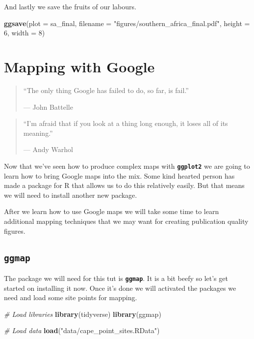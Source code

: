 \documentclass[]{book}
\newenvironment{Shaded}{\begin{snugshade}}{\end{snugshade}}
\newcommand{\KeywordTok}[1]{\textcolor[rgb]{0.13,0.29,0.53}{\textbf{#1}}}
\newcommand{\DataTypeTok}[1]{\textcolor[rgb]{0.13,0.29,0.53}{#1}}
\newcommand{\DecValTok}[1]{\textcolor[rgb]{0.00,0.00,0.81}{#1}}
\newcommand{\StringTok}[1]{\textcolor[rgb]{0.31,0.60,0.02}{#1}}
\newcommand{\CommentTok}[1]{\textcolor[rgb]{0.56,0.35,0.01}{\textit{#1}}}
\newcommand{\NormalTok}[1]{#1}
\theoremstyle{definition}
\theoremstyle{definition}
\theoremstyle{definition}
\theoremstyle{remark}
\begin{document}
And lastly we save the fruits of our labours.

\begin{Shaded}
\begin{Highlighting}[]
\KeywordTok{ggsave}\NormalTok{(}\DataTypeTok{plot =}\NormalTok{ sa_final, }\DataTypeTok{filename =} \StringTok{"figures/southern_africa_final.pdf"}\NormalTok{, }
       \DataTypeTok{height =} \DecValTok{6}\NormalTok{, }\DataTypeTok{width =} \DecValTok{8}\NormalTok{)}
\end{Highlighting}
\end{Shaded}

\chapter{Mapping with Google}\label{mapping_google}

\begin{quote}
``The only thing Google has failed to do, so far, is fail.''

--- John Battelle
\end{quote}

\begin{quote}
``I'm afraid that if you look at a thing long enough, it loses all of
its meaning.''

--- Andy Warhol
\end{quote}

Now that we've seen how to produce complex maps with
\textbf{\texttt{ggplot2}} we are going to learn how to bring Google maps
into the mix. Some kind hearted person has made a package for R that
allows us to do this relatively easily. But that means we will need to
install another new package.

After we learn how to use Google maps we will take some time to learn
additional mapping techniques that we may want for creating publication
quality figures.

\section{\texorpdfstring{\textbf{\texttt{ggmap}}}{ggmap}}\label{ggmap}

The package we will need for this tut is \textbf{\texttt{ggmap}}. It is
a bit beefy so let's get started on installing it now. Once it's done we
will activated the packages we need and load some site points for
mapping.

\begin{Shaded}
\begin{Highlighting}[]
\CommentTok{# Load libraries}
\KeywordTok{library}\NormalTok{(tidyverse)}
\KeywordTok{library}\NormalTok{(ggmap)}

\CommentTok{# Load data}
\KeywordTok{load}\NormalTok{(}\StringTok{"data/cape_point_sites.RData"}\NormalTok{)}
\end{Highlighting}
\end{Shaded}
\end{document}
